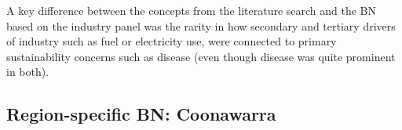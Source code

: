 A key difference between the concepts from the literature search and the BN based on the industry panel was the rarity in how secondary and tertiary drivers of industry such as fuel or electricity use, were connected to primary sustainability concerns such as disease (even though disease was quite prominent in both).\


\subsection{Region-specific BN: Coonawarra}

